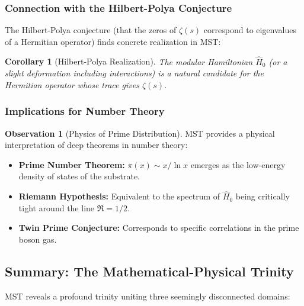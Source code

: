 \documentclass[11pt, a4paper]{article}
\theoremstyle{plain}
\newtheorem{corollary}[theorem]{Corollary}
\theoremstyle{definition}
\newtheorem{observation}[theorem]{Observation}
\begin{document}
\subsubsection{Connection with the Hilbert-Polya Conjecture}

The Hilbert-Polya conjecture (that the zeros of $\zeta(s)$ correspond to eigenvalues of a Hermitian operator) finds concrete realization in MST:

\begin{corollary}[Hilbert-Polya Realization]
The modular Hamiltonian $\hat{H}_0$ (or a slight deformation including interactions) is a natural candidate for the Hermitian operator whose trace gives $\zeta(s)$.
\end{corollary}

\subsubsection{Implications for Number Theory}

\begin{observation}[Physics of Prime Distribution]
MST provides a physical interpretation of deep theorems in number theory:
\begin{itemize}
    \item \textbf{Prime Number Theorem:} $\pi(x) \sim x/\ln x$ emerges as the low-energy density of states of the substrate.
    
    \item \textbf{Riemann Hypothesis:} Equivalent to the spectrum of $\hat{H}_0$ being critically tight around the line $\Re = 1/2$.
    
    \item \textbf{Twin Prime Conjecture:} Corresponds to specific correlations in the prime boson gas.
\end{itemize}
\end{observation}

\subsection{Summary: The Mathematical-Physical Trinity}

MST reveals a profound trinity uniting three seemingly disconnected domains:
\end{document}
